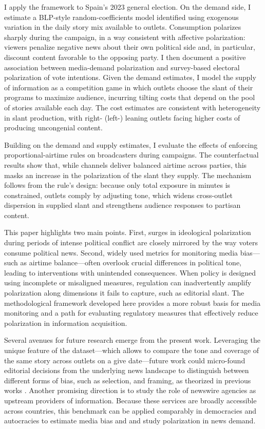 \documentclass[12pt]{article}
\begin{document}
I apply the framework to Spain’s 2023 general election. On the demand side, I estimate a BLP-style random-coefficients model identified using exogenous variation in the daily story mix available to outlets. Consumption polarizes sharply during the campaign, in a way consistent with affective polarization: viewers penalize negative news about their own political side and, in particular, discount content favorable to the opposing party. I then document a positive association between media-demand polarization and survey-based electoral polarization of vote intentions. Given the demand estimates, I model the supply of information as a competition game in which outlets choose the slant of their programs to maximize audience, incurring tilting costs that depend on the pool of stories available each day. The cost estimates are consistent with heterogeneity in slant production, with right- (left-) leaning outlets facing higher costs of producing uncongenial content.

Building on the demand and supply estimates, I evaluate the effects of enforcing proportional-airtime rules on broadcasters during campaigns. The counterfactual results show that, while channels deliver balanced airtime across parties, this masks an increase in the polarization of the slant they supply. The mechanism follows from the rule’s design: because only total exposure in minutes is constrained, outlets comply by adjusting tone, which widens cross-outlet dispersion in supplied slant and strengthens audience responses to partisan content.

This paper highlights two main points. First, surges in ideological polarization during periods of intense political conflict are closely mirrored by the way voters consume political news. Second, widely used metrics for monitoring media bias—such as airtime balance—often overlook crucial differences in political tone, leading to interventions with unintended consequences. When policy is designed using incomplete or misaligned measures, regulation can inadvertently amplify polarization along dimensions it fails to capture, such as editorial slant. The methodological framework developed here provides a more robust basis for media monitoring and a path for evaluating regulatory measures that effectively reduce polarization in information acquisition.

Several avenues for future research emerge from the present work. Leveraging the unique feature of the dataset—which allows to compare the tone and coverage of the same story across outlets on a give date—future work could micro-found editorial decisions  from the underlying news landscape to distinguish between different forms of bias, such as selection, and framing, as theorized in previous works \citep[e.g.][]{gentzkow2014media}. Another promising direction is to study the role of newswire agencies as  upstream providers of information.  Because these services are broadly accessible across countries, this benchmark can be applied comparably in democracies and autocracies to estimate media bias and and study polarization in news demand.
\end{document}
